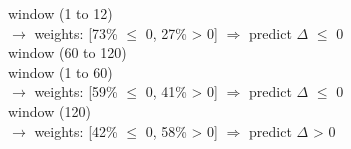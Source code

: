 \begin{flushleft}
\quad \quad \quad window (1 to 12) \\
\quad \quad \quad \quad $\rightarrow$ weights: [73\% $\leq$ 0, 27\% > 0] $\Rightarrow$ predict $\Delta$ $\leq$ 0 \\
\quad window (60 to 120) \\
\quad \quad window (1 to 60) \\
\quad \quad \quad \quad $\rightarrow$ weights: [59\% $\leq$ 0, 41\% > 0] $\Rightarrow$ predict $\Delta$ $\leq$ 0 \\
\quad \quad window (120) \\
\quad \quad \quad \quad $\rightarrow$ weights: [42\% $\leq$ 0, 58\% > 0] $\Rightarrow$ predict $\Delta$ > 0 \\
\end{flushleft}
